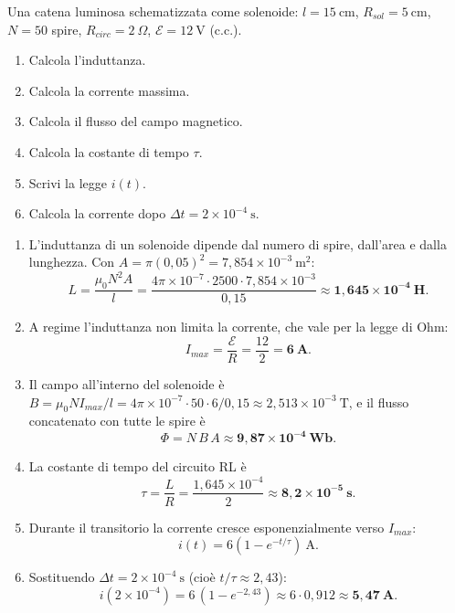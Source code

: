 \begin{question}[ID=1.10, subtitle={Catena luminosa come solenoide — induttanza, corrente e costante di tempo}, tags={induzione magnetica, solenoide, circuito RL}, difficulty=difficile]
Una catena luminosa schematizzata come solenoide: $l = 15\ \text{cm}$, $R_{sol} = 5\ \text{cm}$, $N = 50$ spire, $R_{circ} = 2\ \Omega$, $\mathcal{E} = 12\ \text{V}$ (c.c.).
\begin{enumerate}
\item Calcola l'induttanza.
\item Calcola la corrente massima.
\item Calcola il flusso del campo magnetico.
\item Calcola la costante di tempo $\tau$.
\item Scrivi la legge $i(t)$.
\item Calcola la corrente dopo $\Delta t = 2\times10^{-4}\ \text{s}$.
\end{enumerate}
\begin{solution}
\begin{enumerate}
\item L'induttanza di un solenoide dipende dal numero di spire, dall'area e dalla lunghezza. Con $A = \pi(0{,}05)^2 = 7{,}854\times10^{-3}\ \text{m}^2$:
\[
L = \frac{\mu_0 N^2 A}{l} = \frac{4\pi\times10^{-7}\cdot 2500\cdot 7{,}854\times10^{-3}}{0{,}15} \approx \mathbf{1{,}645\times10^{-4}\ \text{H}}.
\]
\item A regime l'induttanza non limita la corrente, che vale per la legge di Ohm:
\[
I_{max} = \frac{\mathcal{E}}{R} = \frac{12}{2} = \mathbf{6\ \text{A}}.
\]
\item Il campo all'interno del solenoide è $B = \mu_0 N I_{max}/l = 4\pi\times10^{-7}\cdot 50\cdot 6/0{,}15 \approx 2{,}513\times10^{-3}\ \text{T}$, e il flusso concatenato con tutte le spire è
\[
\Phi = N\,B\,A \approx \mathbf{9{,}87\times10^{-4}\ \text{Wb}}.
\]
\item La costante di tempo del circuito RL è
\[
\tau = \frac{L}{R} = \frac{1{,}645\times10^{-4}}{2} \approx \mathbf{8{,}2\times10^{-5}\ \text{s}}.
\]
\item Durante il transitorio la corrente cresce esponenzialmente verso $I_{max}$:
\[
i(t) = 6\!\left(1 - e^{-t/\tau}\right)\ \text{A}.
\]
\item Sostituendo $\Delta t = 2\times10^{-4}\ \text{s}$ (cioè $t/\tau \approx 2{,}43$):
\[
i(2\times10^{-4}) = 6\,(1 - e^{-2{,}43}) \approx 6\cdot 0{,}912 \approx \mathbf{5{,}47\ \text{A}}.
\]
\end{enumerate}
\end{solution}
\end{question}

